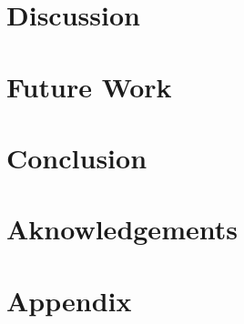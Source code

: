 \documentclass[12pt,a4paper]{article}
\begin{document}
\section{Discussion}

\clearpage
\section{Future Work}

\clearpage
\section{Conclusion}

\section{Aknowledgements}

\clearpage
\section{Appendix}



\clearpage
\end{document}
